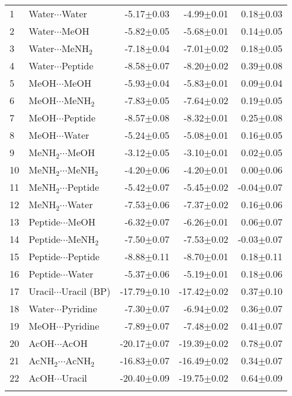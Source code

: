 \begin{longtable}{llrrr}
1 & Water$\cdots$Water & -5.17$\pm$0.03 & -4.99$\pm$0.01 & 0.18$\pm$0.03  \\
2 & Water$\cdots$MeOH & -5.82$\pm$0.05 & -5.68$\pm$0.01 & 0.14$\pm$0.05  \\
3 & Water$\cdots$MeNH$_2$ & -7.18$\pm$0.04 & -7.01$\pm$0.02 & 0.18$\pm$0.05  \\
4 & Water$\cdots$Peptide & -8.58$\pm$0.07 & -8.20$\pm$0.02 & 0.39$\pm$0.08  \\
5 & MeOH$\cdots$MeOH & -5.93$\pm$0.04 & -5.83$\pm$0.01 & 0.09$\pm$0.04  \\
6 & MeOH$\cdots$MeNH$_2$ & -7.83$\pm$0.05 & -7.64$\pm$0.02 & 0.19$\pm$0.05  \\
7 & MeOH$\cdots$Peptide & -8.57$\pm$0.08 & -8.32$\pm$0.01 & 0.25$\pm$0.08  \\
8 & MeOH$\cdots$Water & -5.24$\pm$0.05 & -5.08$\pm$0.01 & 0.16$\pm$0.05  \\
9 & MeNH$_2$$\cdots$MeOH & -3.12$\pm$0.05 & -3.10$\pm$0.01 & 0.02$\pm$0.05  \\
10 & MeNH$_2$$\cdots$MeNH$_2$ & -4.20$\pm$0.06 & -4.20$\pm$0.01 & 0.00$\pm$0.06  \\
11 & MeNH$_2$$\cdots$Peptide & -5.42$\pm$0.07 & -5.45$\pm$0.02 & -0.04$\pm$0.07  \\
12 & MeNH$_2$$\cdots$Water & -7.53$\pm$0.06 & -7.37$\pm$0.02 & 0.16$\pm$0.06  \\
13 & Peptide$\cdots$MeOH & -6.32$\pm$0.07 & -6.26$\pm$0.01 & 0.06$\pm$0.07  \\
14 & Peptide$\cdots$MeNH$_2$ & -7.50$\pm$0.07 & -7.53$\pm$0.02 & -0.03$\pm$0.07  \\
15 & Peptide$\cdots$Peptide & -8.88$\pm$0.11 & -8.70$\pm$0.01 & 0.18$\pm$0.11  \\
16 & Peptide$\cdots$Water & -5.37$\pm$0.06 & -5.19$\pm$0.01 & 0.18$\pm$0.06  \\
17 & Uracil$\cdots$Uracil (BP) & -17.79$\pm$0.10 & -17.42$\pm$0.02 & 0.37$\pm$0.10  \\
18 & Water$\cdots$Pyridine & -7.30$\pm$0.07 & -6.94$\pm$0.02 & 0.36$\pm$0.07  \\
19 & MeOH$\cdots$Pyridine & -7.89$\pm$0.07 & -7.48$\pm$0.02 & 0.41$\pm$0.07  \\
20 & AcOH$\cdots$AcOH & -20.17$\pm$0.07 & -19.39$\pm$0.02 & 0.78$\pm$0.07  \\
21 & AcNH$_2$$\cdots$AcNH$_2$ & -16.83$\pm$0.07 & -16.49$\pm$0.02 & 0.34$\pm$0.07  \\
22 & AcOH$\cdots$Uracil & -20.40$\pm$0.09 & -19.75$\pm$0.02 & 0.64$\pm$0.09  \\
$$
\end{longtable}
